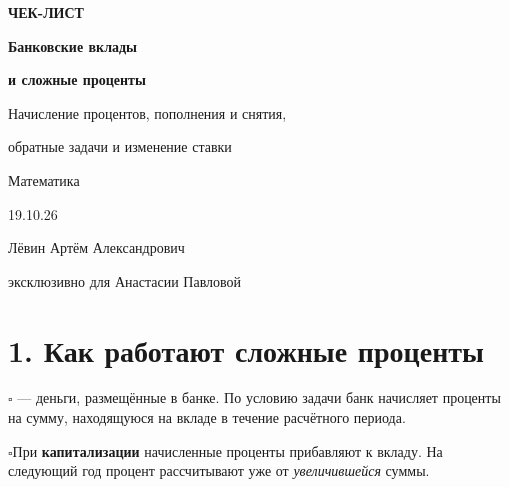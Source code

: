 \documentclass[a4paper,12pt]{article}
\newcommand{\checkitem}[1]{\noindent\(\square\)\enspace #1\par}
\newcommand{\keyterm}[1]{{\color{darkaccent}\textbf{#1}}}
\begin{document}
\setlength{\abovedisplayskip}{7pt}
\setlength{\belowdisplayskip}{7pt}
\setlength{\abovedisplayshortskip}{4pt}
\setlength{\belowdisplayshortskip}{5pt}

\begin{titlepage}
\thispagestyle{empty}
\begin{center}
\vspace*{37mm}
{\Large\color{accent}\bfseries ЧЕК-ЛИСТ\par}
\vspace{12mm}
{\Huge\color{darkaccent}\bfseries Банковские вклады\par}
\vspace{6mm}
{\LARGE\color{darkaccent}\bfseries и сложные проценты\par}
\vspace{11mm}
{\large Начисление процентов, пополнения и снятия,\par}
{\large обратные задачи и изменение ставки\par}
\vspace{23mm}
{\large Математика\par}
\vspace{10mm}
{\large 19.10.26\par}
\vfill
{\normalsize Лёвин Артём Александрович\par}
{\normalsize эксклюзивно для Анастасии Павловой\par}
\vspace{22mm}
\end{center}
\end{titlepage}
\setcounter{page}{2}

\section*{1. Как работают сложные проценты}
\checkitem{\keyterm{Вклад} --- деньги, размещённые в банке. По условию задачи банк начисляет проценты на сумму, находящуюся на вкладе в течение расчётного периода.}
\checkitem{При \keyterm{капитализации} начисленные проценты прибавляют к вкладу. На следующий год процент рассчитывают уже от \emph{увеличившейся} суммы.}
\end{document}
